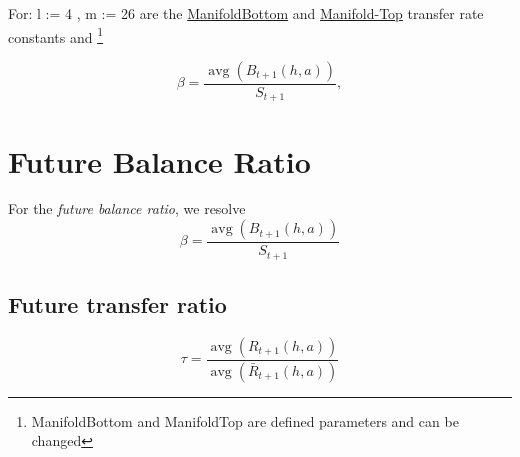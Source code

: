 For: l := 4 , m := 26 are the \url{ManifoldBottom} and \url{Manifold-Top} transfer rate constants and \footnote{ManifoldBottom and ManifoldTop are defined parameters and can be changed}

\label{sec:Calculations}
\begin{equation}
	\beta=\frac{\operatorname{avg}\left(B_{t+1}(h, a)\right)}{S_{t+1}}, 
\end{equation}
\newpage
\section{Future Balance Ratio}
For the \textit{future balance ratio}, we resolve
\label{sec:Calculations}
\begin{equation}
	\beta=\frac{\operatorname{avg}\left(B_{t+1}(h, a)\right)}{S_{t+1}}
\end{equation}
\label{future transfer ratio}
\subsection{Future transfer ratio}
\begin{equation}
	\tau=\frac{\operatorname{avg}\left(R_{t+1}(h, a)\right)}{\operatorname{avg}\left(\bar{R}_{t+1}(h, a)\right)}
\end{equation}

